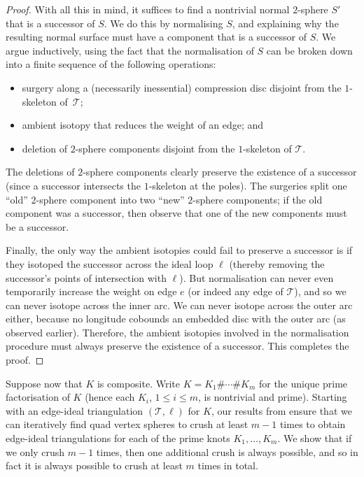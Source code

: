 \documentclass[10pt,a4paper]{amsart}
\newcommand{\tri}{\mathcal{T}}
\begin{document}
\begin{proof}
With all this in mind, it suffices to find a nontrivial normal $2$-sphere $S'$ that is a successor of $S$.
We do this by normalising $S$, and explaining why the resulting normal surface must have a component that is a successor of $S$.
We argue inductively, using the fact that the normalisation of $S$ can be broken down into a finite sequence of the following operations:
\begin{itemize}
\item
surgery along a (necessarily inessential) compression disc disjoint from the $1$-skeleton of~$\tri$;
\item
ambient isotopy that reduces the weight of an edge; and
\item
deletion of $2$-sphere components disjoint from the $1$-skeleton of $\tri$.
\end{itemize}
The deletions of $2$-sphere components clearly preserve the existence of a successor (since a successor intersects the $1$-skeleton at the poles).
The surgeries split one ``old'' $2$-sphere component into two ``new'' $2$-sphere components;
if the old component was a successor, then observe that one of the new components must be a successor.

Finally, the only way the ambient isotopies could fail to preserve a successor is if they isotoped the successor across the ideal loop $\ell$ (thereby removing the successor's points of intersection with $\ell$).
But normalisation can never even temporarily increase the weight on edge $e$ (or indeed any edge of $\tri$), and so we can never isotope across the inner arc.
We can never isotope across the outer arc either, because no longitude cobounds an embedded disc with the outer arc (as observed earlier).
Therefore, the ambient isotopies involved in the normalisation procedure must always preserve the existence of a successor.
This completes the proof.
\end{proof}

Suppose now that $K$ is composite.
Write $K = K_1 \# \cdots \# K_m$ for the unique prime factorisation of $K$ (hence each $K_i$, $1\leqslant i \leqslant m$, is nontrivial and prime).
Starting with an edge-ideal triangulation $(\tri,\ell)$ for $K$, our results from  ensure that we can iteratively find quad vertex spheres to crush at least $m-1$ times to obtain edge-ideal triangulations for each of the prime knots $K_1,\ldots,K_m$.
We show that if we only crush $m-1$ times, then one additional crush is always possible, and so in fact it is always possible to crush at least $m$ times in total.
\end{document}
